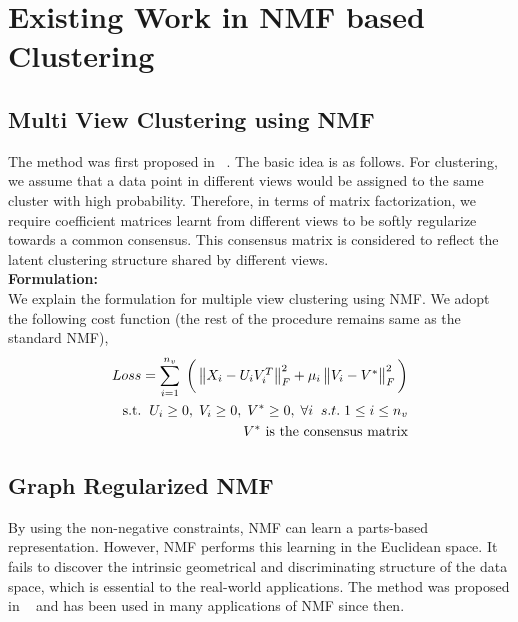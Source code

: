 \documentclass[a4paper]{article}
\begin{document}
	\tableofcontents

	\pagebreak	
	
	\section{Existing Work in NMF based Clustering}
	
	\subsection{Multi View Clustering using NMF}

The method was first proposed in ~\cite{nmfsdm}. The basic idea is as follows. For clustering, we assume that a data point in different views would be assigned to the same cluster with high probability. Therefore, in terms of matrix factorization, we require coefficient matrices learnt from different views to be softly regularize towards a common consensus. This consensus matrix is considered to reflect the latent clustering structure shared by different views.\\
	
	\noindent
	\textbf{Formulation:}\\
	We explain the formulation for multiple view clustering using NMF. We adopt the following cost function (the rest of the procedure remains same as the standard NMF),
	\begin{multline*}	
	Loss = \displaystyle\sum_{i=1}^{n_{v}} \; \bigg(\begin{Vmatrix} X_{i}-U_{i}V^{T}_{i} \end{Vmatrix}^{2}_{F}	
		+ \mu_{i}\begin{Vmatrix} V_{i}-V^{*}\end{Vmatrix}^{2}_{F} \bigg) \\	
		\hfill {\text{s.t.}} \hspace{2mm}  U_{i}\geq0,\;V_{i}\geq0,\;V^{*}\geq0,\; \forall i \;\;s.t.\; 1 \leq i \leq n_{v}\\
		\hfill V^{*} \text{ is the consensus matrix}
	\end{multline*}	
	
	\subsection{Graph Regularized NMF}
	
	By using the non-negative constraints, NMF can learn a parts-based representation. However, NMF performs
this learning in the Euclidean space. It fails to discover the intrinsic geometrical and discriminating structure of the data space, which is essential to the real-world applications. The method was proposed in ~\cite{GReg} and has been used in many applications of NMF since then.	\\
\end{document}
